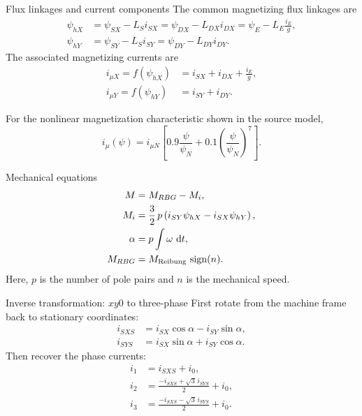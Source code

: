 \begin{formulaBox}{Flux linkages and current components}
	The common magnetizing flux linkages are
	\begin{align}
		\psi_{hX}
		&= \psi_{SX}-L_S i_{SX}
		= \psi_{DX}-L_{DX}i_{DX}
		= \psi_E-L_E\frac{i_E}{g}, \\
		\psi_{hY}
		&= \psi_{SY}-L_S i_{SY}
		= \psi_{DY}-L_{DY}i_{DY}.
	\end{align}
	The associated magnetizing currents are
	\begin{align}
		i_{\mu X}=f(\psi_{hX}) &= i_{SX}+i_{DX}+\frac{i_E}{g}, \\
		i_{\mu Y}=f(\psi_{hY}) &= i_{SY}+i_{DY}.
	\end{align}
	
	For the nonlinear magnetization characteristic shown in the source model,
	\begin{equation}
		i_\mu(\psi)=i_{\mu N}
		\left[
		0.9\frac{\psi}{\psi_N}
		+0.1\left(\frac{\psi}{\psi_N}\right)^7
		\right].
	\end{equation}
\end{formulaBox}

\begin{formulaBox}{Mechanical equations}
	\begin{align}
		M &= M_{RBG}-M_i, \\
		M_i &= \frac{3}{2}\,p\left(i_{SY}\psi_{hX}-i_{SX}\psi_{hY}\right), \\
		\alpha &= p\int \omega\,\mathop{}\!\mathrm{d} t, \\
		M_{RBG} &= M_{\mathrm{Reibung}}\,\operatorname{sign}(n).
	\end{align}
	Here, $p$ is the number of pole pairs and $n$ is the mechanical speed.
\end{formulaBox}

\begin{formulaBox}{Inverse transformation: $xy0$ to three-phase}
	First rotate from the machine frame back to stationary coordinates:
	\begin{align}
		i_{SXS} &= i_{SX}\cos\alpha-i_{SY}\sin\alpha, \\
		i_{SYS} &= i_{SX}\sin\alpha+i_{SY}\cos\alpha.
	\end{align}
	Then recover the phase currents:
	\begin{align}
		i_1 &= i_{SXS}+i_0, \\
		i_2 &= \frac{-i_{SXS}+\sqrt{3}\,i_{SYS}}{2}+i_0, \\
		i_3 &= \frac{-i_{SXS}-\sqrt{3}\,i_{SYS}}{2}+i_0.
	\end{align}
\end{formulaBox}

